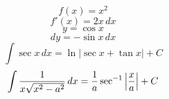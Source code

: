 \def\dx{\,dx}
$$ f(x) = x^2 $$
$$ f'(x) = 2x\dx $$
$$ y = \cos x $$
$$ dy = -\sin x\dx$$
$$ \int{\sec x\dx} = \ln{|\sec x + \tan x|} + C $$ 
$$ \int{{1 \over {x\sqrt{x^2 - a^2}}}\dx} = 
{1 \over a}\sec^{-1}{\left| x \over a \right|} + C $$
\bye
